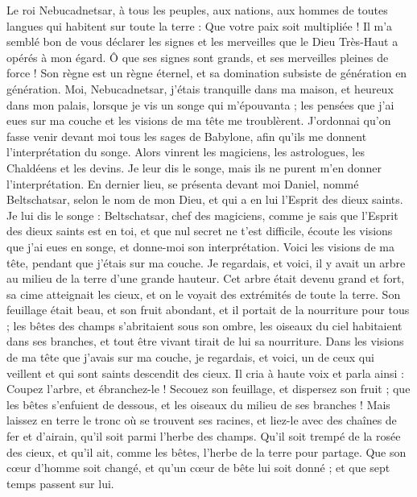 \begin{multicols}{2}
\VerseOne{}Le roi Nebucadnetsar, à tous les peuples, aux nations, aux hommes de toutes langues qui habitent sur toute la terre : Que votre paix soit multipliée !
Il m'a semblé bon de vous déclarer les signes et les merveilles que le Dieu Très-Haut a opérés à mon égard.
Ô que ses signes sont grands, et ses merveilles pleines de force ! Son règne est un règne éternel, et sa domination subsiste de génération en génération.
Moi, Nebucadnetsar, j'étais tranquille dans ma maison, et heureux dans mon palais,
lorsque je vis un songe qui m'épouvanta ; les pensées que j'ai eues sur ma couche et les visions de ma tête me troublèrent.
J'ordonnai qu'on fasse venir devant moi tous les sages de Babylone, afin qu'ils me donnent l'interprétation du songe.
Alors vinrent les magiciens, les astrologues, les Chaldéens et les devins. Je leur dis le songe, mais ils ne purent m'en donner l'interprétation.
En dernier lieu, se présenta devant moi Daniel, nommé Beltschatsar, selon le nom de mon Dieu, et qui a en lui l'Esprit des dieux saints. Je lui dis le songe :
Beltschatsar, chef des magiciens, comme je sais que l'Esprit des dieux saints est en toi, et que nul secret ne t'est difficile, écoute les visions que j'ai eues en songe, et donne-moi son interprétation.
Voici les visions de ma tête, pendant que j'étais sur ma couche. Je regardais, et voici, il y avait un arbre au milieu de la terre d'une grande hauteur.
Cet arbre était devenu grand et fort, sa cime atteignait les cieux, et on le voyait des extrémités de toute la terre.
Son feuillage était beau, et son fruit abondant, et il portait de la nourriture pour tous ; les bêtes des champs s'abritaient sous son ombre, les oiseaux du ciel habitaient dans ses branches, et tout être vivant tirait de lui sa nourriture.
Dans les visions de ma tête que j'avais sur ma couche, je regardais, et voici, un de ceux qui veillent et qui sont saints descendit des cieux.
Il cria à haute voix et parla ainsi : Coupez l'arbre, et ébranchez-le ! Secouez son feuillage, et dispersez son fruit ; que les bêtes s'enfuient de dessous, et les oiseaux du milieu de ses branches !
Mais laissez en terre le tronc où se trouvent ses racines, et liez-le avec des chaînes de fer et d'airain, qu'il soit parmi l'herbe des champs. Qu'il soit trempé de la rosée des cieux, et qu'il ait, comme les bêtes, l'herbe de la terre pour partage.
Que son cœur d'homme soit changé, et qu'un cœur de bête lui soit donné ; et que sept temps passent sur lui.

\end{multicols}
